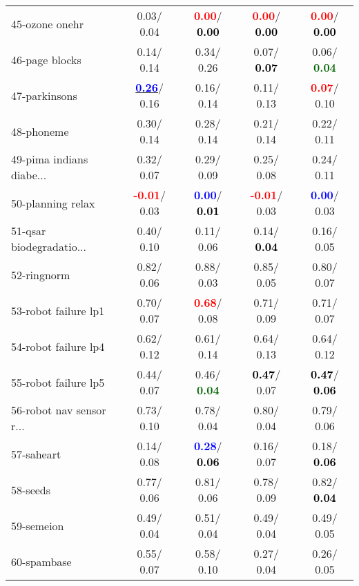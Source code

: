\begin{table}[h]
\begin{center}
\begin{tabular}{lc|c|c|c}
45-ozone onehr &   0.03/  0.04 & \textcolor{red}{\textbf{  0.00}}/\textcolor{black}{\textbf{  0.00}} & \textcolor{red}{\textbf{  0.00}}/\textcolor{black}{\textbf{  0.00}} & \textcolor{red}{\textbf{  0.00}}/\textcolor{black}{\textbf{  0.00}} \\
46-page blocks &   0.14/  0.14 &   0.34/  0.26 &   0.07/\textcolor{black}{\textbf{  0.07}} &   0.06/\textcolor{darkgreen}{\textbf{  0.04}} \\ \hline
47-parkinsons & \underline{\textcolor{blue}{\textbf{  0.26}}}/  0.16 &   0.16/  0.14 &   0.11/  0.13 & \textcolor{red}{\textbf{  0.07}}/  0.10 \\
48-phoneme &   0.30/  0.14 &   0.28/  0.14 &   0.21/  0.14 &   0.22/  0.11 \\
49-pima indians diabe... &   0.32/  0.07 &   0.29/  0.09 &   0.25/  0.08 &   0.24/  0.11 \\
50-planning relax & \textcolor{red}{\textbf{ -0.01}}/  0.03 & \textcolor{blue}{\textbf{  0.00}}/\textcolor{black}{\textbf{  0.01}} & \textcolor{red}{\textbf{ -0.01}}/  0.03 & \textcolor{blue}{\textbf{  0.00}}/  0.03 \\
51-qsar biodegradatio... &   0.40/  0.10 &   0.11/  0.06 &   0.14/\textcolor{black}{\textbf{  0.04}} &   0.16/  0.05 \\
52-ringnorm &   0.82/  0.06 &   0.88/  0.03 &   0.85/  0.05 &   0.80/  0.07 \\
53-robot failure lp1 &   0.70/  0.07 & \textcolor{red}{\textbf{  0.68}}/  0.08 &   0.71/  0.09 &   0.71/  0.07 \\ \hline
54-robot failure lp4 &   0.62/  0.12 &   0.61/  0.14 &   0.64/  0.13 &   0.64/  0.12 \\
55-robot failure lp5 &   0.44/  0.07 &   0.46/\textcolor{darkgreen}{\textbf{  0.04}} & \textcolor{black}{\textbf{  0.47}}/  0.07 & \textcolor{black}{\textbf{  0.47}}/\textcolor{black}{\textbf{  0.06}} \\
56-robot nav sensor r... &   0.73/  0.10 &   0.78/  0.04 &   0.80/  0.04 &   0.79/  0.06 \\
57-saheart &   0.14/  0.08 & \textcolor{blue}{\textbf{  0.28}}/\textcolor{black}{\textbf{  0.06}} &   0.16/  0.07 &   0.18/\textcolor{black}{\textbf{  0.06}} \\
58-seeds &   0.77/  0.06 &   0.81/  0.06 &   0.78/  0.09 &   0.82/\textcolor{black}{\textbf{  0.04}} \\
59-semeion &   0.49/  0.04 &   0.51/  0.04 &   0.49/  0.04 &   0.49/  0.05 \\
60-spambase &   0.55/  0.07 &   0.58/  0.10 &   0.27/  0.04 &   0.26/  0.05 \\ \hline

\end{tabular}
\end{center}
\end{table}
